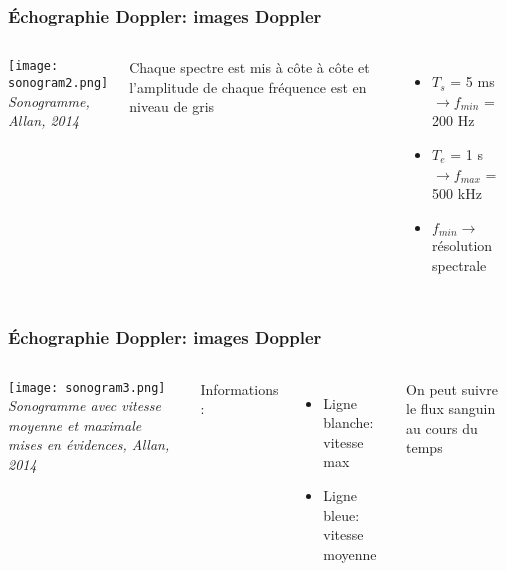 \documentclass{beamer}
\begin{document}
\begin{frame}
\frametitle{\'Echographie Doppler: images Doppler}
\begin{columns}
\column{60mm}
\begin{center}
\texttt{[image: sonogram2.png]}\\
\textit{\footnotesize Sonogramme, Allan, 2014}
\end{center}
\column{60mm}
Chaque spectre est mis à côte à côte et l'amplitude de chaque fréquence est en niveau de gris
\vspace{0.3cm}
\begin{itemize}
\item $T_s$ = 5 ms  $\rightarrow f_{min}$ = 200 Hz 
\vspace{0.3cm}
\item $T_e$ = 1 \textmu s $\rightarrow f_{max}$ = 500 kHz 
\vspace{0.3cm}
\item $f_{min} \rightarrow$ résolution spectrale
\end{itemize}
\end{columns}
\end{frame}

\begin{frame}
\frametitle{\'Echographie Doppler: images Doppler}
\begin{columns}
\column{80mm}
\begin{center}
\texttt{[image: sonogram3.png]}\\
\textit{\footnotesize Sonogramme avec vitesse moyenne et maximale mises en évidences, Allan, 2014}
\end{center}
\column{40mm}
Informations :
\vspace{0.3cm}
\begin{itemize}
\item Ligne blanche: vitesse max 
\vspace{0.3cm}
\item Ligne bleue: vitesse moyenne
\vspace{0.3cm}
\end{itemize}
On peut suivre le flux sanguin au cours du temps
\end{columns}
\end{frame}
\end{document}
